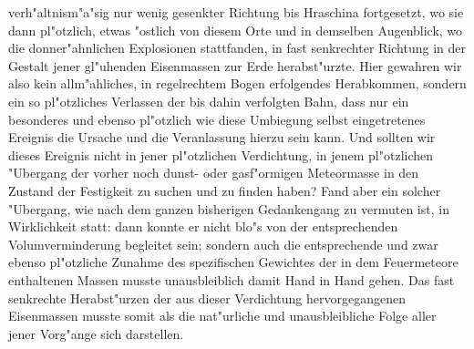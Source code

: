 \documentclass[a4paper, 8pt, oneside, polutonikogreek, german]{article}
\begin{document}
verh"altnism"a"sig nur wenig gesenkter Richtung bis Hraschina fortgesetzt, wo sie dann pl"otzlich, etwas "ostlich von diesem Orte und in demselben Augenblick, wo die donner"ahnlichen Explosionen stattfanden, in fast senkrechter Richtung in der Gestalt jener gl"uhenden Eisenmassen zur Erde herabst"urzte. Hier gewahren wir also kein allm"ahliches, in regelrechtem Bogen erfolgendes Herabkommen, sondern ein so pl"otzliches Verlassen der bis dahin verfolgten Bahn, dass nur ein besonderes und ebenso pl"otzlich wie diese Umbiegung selbst eingetretenes Ereignis die Ursache und die Veranlassung hierzu sein kann. Und sollten wir dieses Ereignis nicht in jener pl"otzlichen Verdichtung, in jenem pl"otzlichen "Ubergang der vorher noch dunst- oder gasf"ormigen Meteormasse in den Zustand der Festigkeit zu suchen und zu finden haben? Fand aber ein solcher "Ubergang, wie nach dem ganzen bisherigen Gedankengang zu vermuten ist, in Wirklichkeit statt: dann konnte er nicht blo"s von der entsprechenden Volumverminderung begleitet sein; sondern auch die entsprechende und zwar ebenso pl"otzliche Zunahme des spezifischen Gewichtes der in dem Feuermeteore enthaltenen Massen musste unausbleiblich damit Hand in Hand gehen. Das fast senkrechte Herabst"urzen der aus dieser Verdichtung hervorgegangenen Eisenmassen musste somit als die nat"urliche und unausbleibliche Folge aller jener Vorg"ange sich darstellen.
\end{document}

